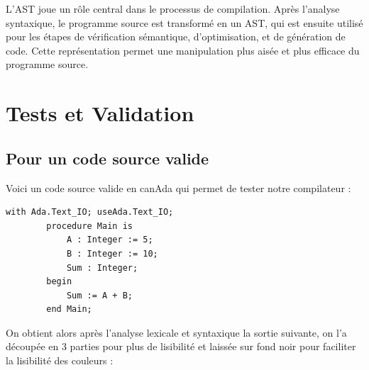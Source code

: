 \documentclass[french,a4paper]{article}
\begin{document}
    L'AST joue un rôle central dans le processus de compilation.
    Après l'analyse syntaxique, le programme source est transformé en un AST, qui est ensuite utilisé pour les étapes de vérification sémantique, d'optimisation, et de génération de code.
    Cette représentation permet une manipulation plus aisée et plus efficace du programme source.

    \section{Tests et Validation}\label{sec:tests-et-validation}

    \subsection{Pour un code source valide}\label{subsec:pour-un-code-source-valide}

    Voici un code source valide en canAda qui permet de tester notre compilateur :

    \begin{lstlisting}[label={lst:lstlisting16}]
        with Ada.Text_IO; useAda.Text_IO;
        procedure Main is
            A : Integer := 5;
            B : Integer := 10;
            Sum : Integer;
        begin
            Sum := A + B;
        end Main;
    \end{lstlisting}

    On obtient alors après l'analyse lexicale et syntaxique la sortie suivante, on l'a découpée en 3 parties pour plus de lisibilité et laissée sur fond noir pour faciliter la lisibilité des couleurs :
\end{document}
